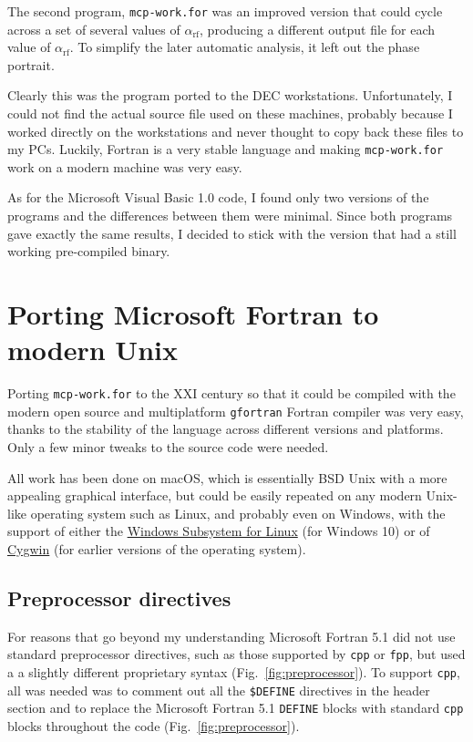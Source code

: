 The second program, \texttt{mcp-work.for} was an improved version that could cycle across a  set of several values of $\alpha_\mathrm{rf}$, producing a different output file for each value of $\alpha_\mathrm{rf}$. To simplify the later automatic analysis, it left out the phase portrait.

Clearly this was the program ported to the DEC workstations. 
Unfortunately, I could not find the actual source file used on these machines, probably because I worked directly on the workstations and never thought to copy back these files to my PCs.
Luckily, Fortran is a very stable language and making \texttt{mcp-work.for} work on a modern machine was very easy.

As for the Microsoft Visual Basic 1.0 code, I found only two versions of the programs and the differences between them were minimal. Since both programs gave exactly the same results, I decided to stick with the version that had a still working pre-compiled binary.



\section{Porting Microsoft Fortran to modern Unix}

Porting \texttt{mcp-work.for} to the XXI century so that it could be compiled with the modern open source and multiplatform \texttt{gfortran} Fortran compiler was very easy, thanks to the stability of the language across different versions and platforms. Only a few minor tweaks to the source code were needed.

All work has been done on macOS, which is essentially BSD Unix with a more appealing graphical interface, but could be easily repeated on any modern Unix-like operating system such as Linux, and probably even on Windows, with the support of either the \href{https://docs.microsoft.com/en-us/windows/wsl/}{Windows Subsystem for Linux} (for Windows 10) or of \href{http://www.cygwin.org/}{Cygwin} (for earlier versions of the operating system).



\subsection{Preprocessor directives}

For reasons that go beyond my understanding Microsoft Fortran 5.1 did not use standard preprocessor directives, such as those supported by \texttt{cpp} or \texttt{fpp}, \cite{Boyanski:1992} but used a a slightly different proprietary syntax (Fig.~\ref{fig:preprocessor}). 
To support \texttt{cpp}, all was needed was to comment out all the \texttt{\$DEFINE} directives in the header section and to replace the Microsoft Fortran 5.1 \texttt{DEFINE} blocks with standard \texttt{cpp} blocks throughout the code (Fig.~\ref{fig:preprocessor}). 

